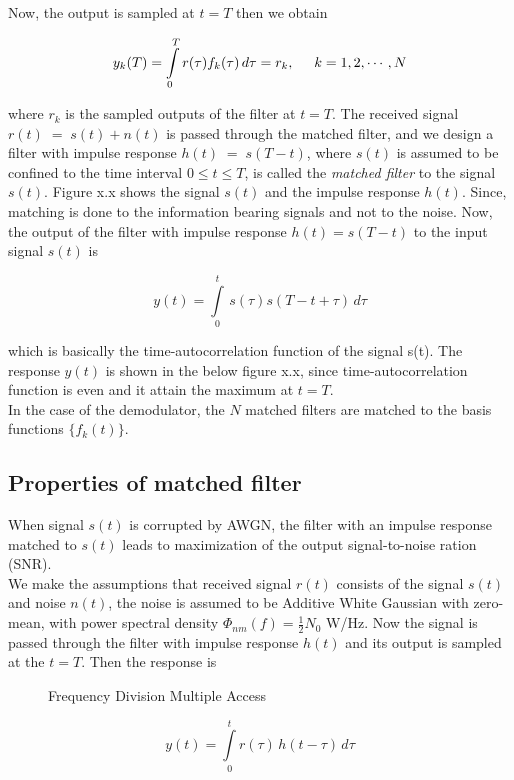 Now, the output is sampled at $t=T$ then we obtain

\begin{equation}
y_k(T)=\int\limits_{0}^{T}r(\tau)f_k(\tau)\,d\tau = r_k,\hspace{5mm}k=1,2,\cdots,N
\end{equation}

where $r_k$ is the sampled outputs of the filter at $t=T$. The received signal $r(t)\;=\;s(t)+n(t)$ is passed through the matched filter, and we design a filter with impulse response $h(t)\;=\;s(T-t)$, where $s(t)$ is assumed to be confined to the time interval $0\leq t \leq T$, is called the \textit{matched filter} to the signal $s(t)$. Figure x.x shows the signal $s(t)$ and the impulse response $h(t)$. Since, matching is done to the information bearing signals and not to the noise. Now, the output of the filter with impulse response $h(t)=s(T-t)$ to the input signal $s(t)$ is

\begin{equation}
y(t)=\int\limits_{0}^{t}\,s(\tau)s(T-t+\tau)\,d\tau
\end{equation}

which is basically the time-autocorrelation function of the signal s(t). The response $y(t)$ is shown in the below figure x.x, since time-autocorrelation function is even and it attain the maximum at $t=T$.\\

In the case of the demodulator, the $N$ matched filters are matched to the basis functions $\{f_k(t)\}$.

\subsection{Properties of matched filter}
When signal $s(t)$ is corrupted by AWGN, the filter with an impulse response matched to $s(t)$ leads to maximization of the output signal-to-noise ration (SNR).\\

We make the assumptions that received signal $r(t)$ consists of the signal $s(t)$ and noise $n(t)$, the noise is assumed to be Additive White Gaussian with zero-mean, with power spectral density $\Phi_{nm}(f)=\frac{1}{2}N_0$ W/Hz. Now the signal is passed through the filter with impulse response $h(t)$ and its output is sampled at the $t=T$. Then the response is
\begin{figure}[htb]
  \centerline{  }
  \caption{Frequency Division Multiple Access}
\end{figure}
\begin{equation}
y(t)=\int\limits_{0}^{t}r(\tau)\,h(t-\tau)\,d\tau
\end{equation}

